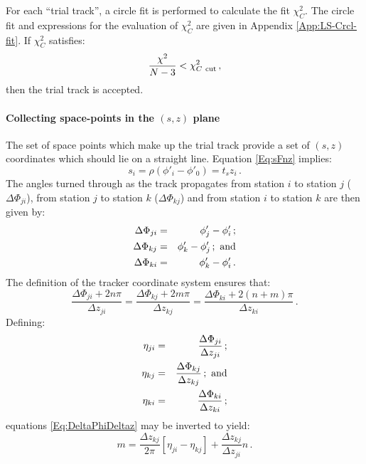 For each ``trial track'', a circle fit is performed to calculate the
fit $\chi_C^2$.
The circle fit and expressions for the evaluation of $\chi^2_C$ are
given in Appendix \ref{App:LS-Crcl-fit}.
If $\chi^2_C$ satisfies:
\begin{equation}
  \frac{\chi^2}{N-3} < \chi^2_{C~{\rm cut}} \,,
\end{equation}
then the trial track is accepted.

\paragraph{Collecting space-points in the $(s, z)$ plane}

The set of space points which make up the trial track provide a set of
$(s, z)$ coordinates which should lie on a straight line.
Equation \ref{Eq:sFnz} implies:
\begin{equation}
  s_i = \rho ( \phi'_i - \phi'_0 ) = t_s z_i \, .
\end{equation}
The angles turned through as the track propagates from station $i$ to
station $j$ ($\Delta \Phi_{ji}$), from station $j$ to station $k$ 
($\Delta \Phi_{kj}$) and from station $i$ to station $k$ are then
given by: 
\begin{eqnarray}
  \Delta \Phi_{ji} & = & \phi'_j - \phi'_i \, ;    \\
  \Delta \Phi_{kj} & = & \phi'_k - \phi'_j \, ; {\rm~and}  \\
  \Delta \Phi_{ki} & = & \phi'_k - \phi'_i \, .
\end{eqnarray}
The definition of the tracker coordinate system ensures that:
\begin{equation}
  \frac{\Delta \Phi_{ji} + 2 n \pi}{\Delta z_{ji}} = 
  \frac{\Delta \Phi_{kj} + 2 m \pi}{\Delta z_{kj}} = 
  \frac{\Delta \Phi_{ki} + 2 (n+m) \pi}{\Delta z_{ki}} \, .
  \label{Eq:DeltaPhiDeltaz}
\end{equation}
Defining:
\begin{eqnarray}
  \eta_{ji} & = & \frac{\Delta \Phi_{ji}}{\Delta z_{ji}} \, ;           \\
  \eta_{kj} & = & \frac{\Delta \Phi_{kj}}{\Delta z_{kj}} \, ; {\rm~and} \\
  \eta_{ki} & = & \frac{\Delta \Phi_{ki}}{\Delta z_{ki}} \, ;
\end{eqnarray}
equations \ref{Eq:DeltaPhiDeltaz} may be inverted to yield:
\begin{equation}
  m = \frac{\Delta z_{kj}}{2 \pi} \left[ \eta_{ji} - \eta_{kj} \right] +
      \frac{\Delta z_{kj}}{\Delta z_{ji}} n \, .
\end{equation}

